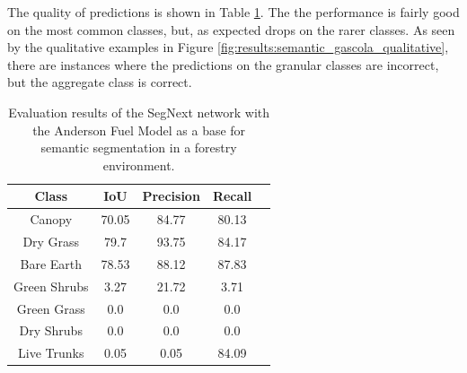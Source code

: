 The quality of predictions is shown in Table \ref{tab:results:semantic_eval}. The the performance is fairly good on the most common classes, but, as expected drops on the rarer classes. As seen by the qualitative examples in Figure \ref{fig:results:semantic_gascola_qualitative}, there are instances where the predictions on the granular classes are incorrect, but the aggregate class is correct.

\begin{table}[ht!]
    \centering
\begin{tabular}{ccccc}
\toprule
\textbf{Class} & \textbf{IoU} & \textbf{Precision} & \textbf{Recall} \\ \midrule
Canopy & 70.05 & 84.77 & 80.13 \\
Dry Grass & 79.7 & 93.75 & 84.17 \\
Bare Earth & 78.53 & 88.12 & 87.83 \\
Green Shrubs & 3.27 & 21.72 & 3.71 \\
Green Grass & 0.0 & 0.0 & 0.0 \\
Dry Shrubs & 0.0 & 0.0 & 0.0 \\
Live Trunks & 0.05 & 0.05 & 84.09 \\
\bottomrule
\end{tabular}
\caption{Evaluation results of the SegNext network with the Anderson Fuel Model as a base for semantic segmentation in a forestry environment.}
\label{tab:results:semantic_eval}
\end{table}


